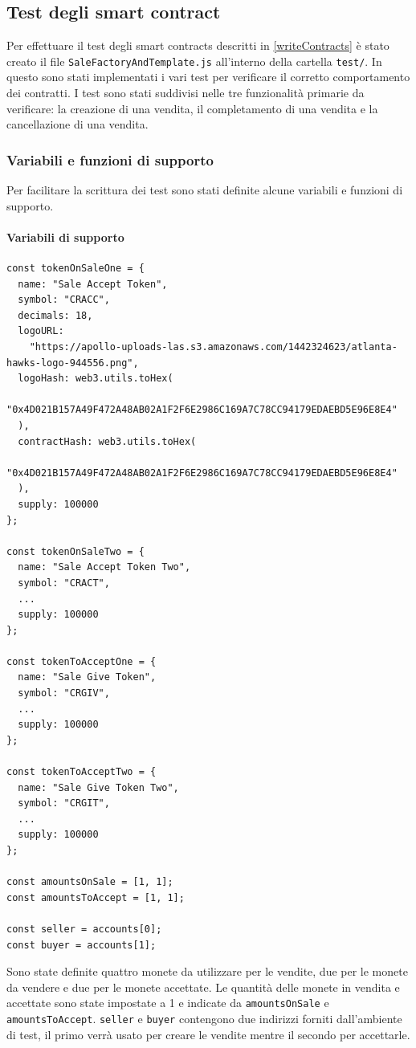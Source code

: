 \documentclass[a4paper]{article}
\begin{document}
        \subsection{Test degli smart contract}
        Per effettuare il test degli smart contracts descritti in \ref{writeContracts} è stato creato il file \verb|SaleFactoryAndTemplate.js| all'interno della cartella \verb|test/|. In questo sono stati implementati i vari test per verificare il corretto comportamento dei contratti.
        I test sono stati suddivisi nelle tre funzionalità primarie da verificare: la creazione di una vendita, il completamento di una vendita e la cancellazione di una vendita.
        \subsubsection{Variabili e funzioni di supporto}
        Per facilitare la scrittura dei test sono stati definite alcune variabili e funzioni di supporto.
        \paragraph{Variabili di supporto}
        \label{testVars}
\begin{lstlisting}[style=ES6, title={Variabili di supporto nel test}]
const tokenOnSaleOne = {
  name: "Sale Accept Token",
  symbol: "CRACC",
  decimals: 18,
  logoURL:
    "https://apollo-uploads-las.s3.amazonaws.com/1442324623/atlanta-hawks-logo-944556.png",
  logoHash: web3.utils.toHex(
    "0x4D021B157A49F472A48AB02A1F2F6E2986C169A7C78CC94179EDAEBD5E96E8E4"
  ),
  contractHash: web3.utils.toHex(
    "0x4D021B157A49F472A48AB02A1F2F6E2986C169A7C78CC94179EDAEBD5E96E8E4"
  ),
  supply: 100000
};

const tokenOnSaleTwo = {
  name: "Sale Accept Token Two",
  symbol: "CRACT",
  ...
  supply: 100000
};

const tokenToAcceptOne = {
  name: "Sale Give Token",
  symbol: "CRGIV",
  ...
  supply: 100000
};

const tokenToAcceptTwo = {
  name: "Sale Give Token Two",
  symbol: "CRGIT",
  ...
  supply: 100000
};

const amountsOnSale = [1, 1];
const amountsToAccept = [1, 1];

const seller = accounts[0];
const buyer = accounts[1];\end{lstlisting}
        Sono state definite quattro monete da utilizzare per le vendite, due per le monete da vendere e due per le monete accettate. Le quantità delle monete in vendita e accettate sono state impostate a 1 e indicate da
        \verb|amountsOnSale| e \verb|amountsToAccept|. \verb|seller| e \verb|buyer| contengono due indirizzi forniti dall'ambiente di test, il primo verrà usato per creare le vendite mentre il secondo per accettarle.
\end{document}
